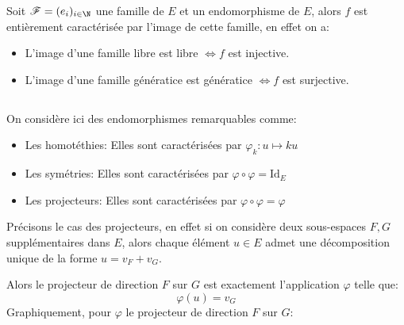Soit \(\mathscr{F} = (e_i)_{i \in \N}\) une famille de \(E\) et un endomorphisme de \(E\), alors \(f\) est entièrement caractérisée par l'image de cette famille, en effet on a:
\begin{itemize}
   \item L'image d'une famille libre est libre \(\Longleftrightarrow f\) est injective.
   \item L'image d'une famille génératice est génératice \(\Longleftrightarrow f\) est surjective.      
\end{itemize}

\subsection*{}

On considère ici des endomorphismes remarquables comme:
\begin{itemize}
   \item Les homotéthies: Elles sont caractérisées par \(\varphi_k : u \longmapsto ku\)
   \item Les symétries: Elles sont caractérisées par \(\varphi \circ \varphi = \text{Id}_E\)
   \item Les projecteurs: Elles sont caractérisées par \(\varphi \circ \varphi = \varphi\)
\end{itemize}
Précisons le cas des projecteurs, en effet si on considère deux sous-espaces \(F, G\) supplémentaires dans \(E\), alors chaque élément \(u \in E\) admet une décomposition unique de la forme \(u = v_F + v_G\).\<

Alors le projecteur de direction \(F\) sur \(G\) est exactement l'application \(\varphi\) telle que:
\[
   \varphi(u) = v_G
\]
Graphiquement, pour \(\varphi\) le projecteur de direction \(F\) sur \(G\):
\begin{center}
\end{center}


